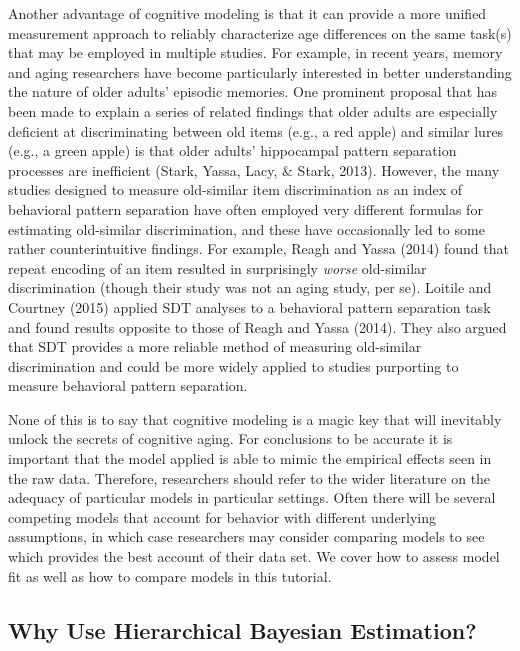 \documentclass[
  english,
  ,man,floatsintext]{apa6}
\begin{document}
Another advantage of cognitive modeling is that it can provide a more unified measurement approach to reliably characterize age differences on the same task(s) that may be employed in multiple studies. For example, in recent years, memory and aging researchers have become particularly interested in better understanding the nature of older adults' episodic memories. One prominent proposal that has been made to explain a series of related findings that older adults are especially deficient at discriminating between old items (e.g., a red apple) and similar lures (e.g., a green apple) is that older adults' hippocampal pattern separation processes are inefficient (Stark, Yassa, Lacy, \& Stark, 2013). However, the many studies designed to measure old-similar item discrimination as an index of behavioral pattern separation have often employed very different formulas for estimating old-similar discrimination, and these have occasionally led to some rather counterintuitive findings. For example, Reagh and Yassa (2014) found that repeat encoding of an item resulted in surprisingly \emph{worse} old-similar discrimination (though their study was not an aging study, per se). Loitile and Courtney (2015) applied SDT analyses to a behavioral pattern separation task and found results opposite to those of Reagh and Yassa (2014). They also argued that SDT provides a more reliable method of measuring old-similar discrimination and could be more widely applied to studies purporting to measure behavioral pattern separation.

None of this is to say that cognitive modeling is a magic key that will inevitably unlock the secrets of cognitive aging. For conclusions to be accurate it is important that the model applied is able to mimic the empirical effects seen in the raw data. Therefore, researchers should refer to the wider literature on the adequacy of particular models in particular settings. Often there will be several competing models that account for behavior with different underlying assumptions, in which case researchers may consider comparing models to see which provides the best account of their data set. We cover how to assess model fit as well as how to compare models in this tutorial.

\hypertarget{why-use-hierarchical-bayesian-estimation}{%
\subsection{Why Use Hierarchical Bayesian Estimation?}\label{why-use-hierarchical-bayesian-estimation}}
\end{document}
